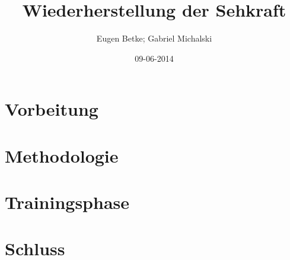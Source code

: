 \documentclass[a4paper,10pt,twoside,notitlepage,twocolumn]{article}
\author{Eugen Betke; Gabriel Michalski}
\title{Wiederherstellung der Sehkraft}
\date{09-06-2014}
\begin{document}
\maketitle

\section{Vorbeitung}
\section{Methodologie}
\section{Trainingsphase}
\section{Schluss}
	
\end{document}
